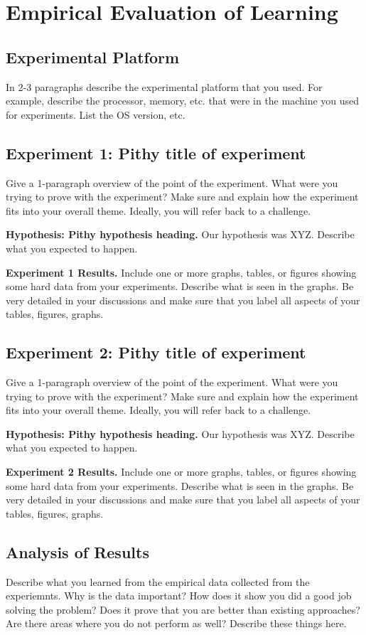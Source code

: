 \section{Empirical Evaluation of Learning}
\label{results}

\subsection{Experimental Platform}

In 2-3 paragraphs describe the experimental
platform that you used. For example, describe
the processor, memory, etc. that were in the
machine you used for experiments. List the OS
version, etc.

\subsection{Experiment 1: Pithy title of experiment}
\label{experiment1}

Give a 1-paragraph overview of the point of the experiment.
What were you trying to prove with the experiment? Make
sure and explain how the experiment fits into your overall
theme. Ideally, you will refer back to a challenge.

\textbf{Hypothesis: Pithy hypothesis heading.} Our
hypothesis was XYZ. Describe what you expected to
happen.

\textbf{Experiment 1 Results.} Include one or more
graphs, tables, or figures showing some hard data
from your experiments. Describe what is seen in the
graphs. Be very detailed in your discussions and make
sure that you label all aspects of your tables, figures,
graphs.

\subsection{Experiment 2: Pithy title of experiment}
\label{experiment2}

Give a 1-paragraph overview of the point of the experiment.
What were you trying to prove with the experiment? Make
sure and explain how the experiment fits into your overall
theme. Ideally, you will refer back to a challenge.

\textbf{Hypothesis: Pithy hypothesis heading.} Our
hypothesis was XYZ. Describe what you expected to
happen.

\textbf{Experiment 2 Results.} Include one or more
graphs, tables, or figures showing some hard data
from your experiments. Describe what is seen in the
graphs. Be very detailed in your discussions and make
sure that you label all aspects of your tables, figures,
graphs.

\subsection{Analysis of Results}
\label{analysis}

Describe what you learned from the empirical data
collected from the experiemnts. Why is the data
important? How does it show you did a good job
solving the problem? Does it prove that you are
better than existing approaches? Are there areas
where you do not perform as well? Describe
these things here.
